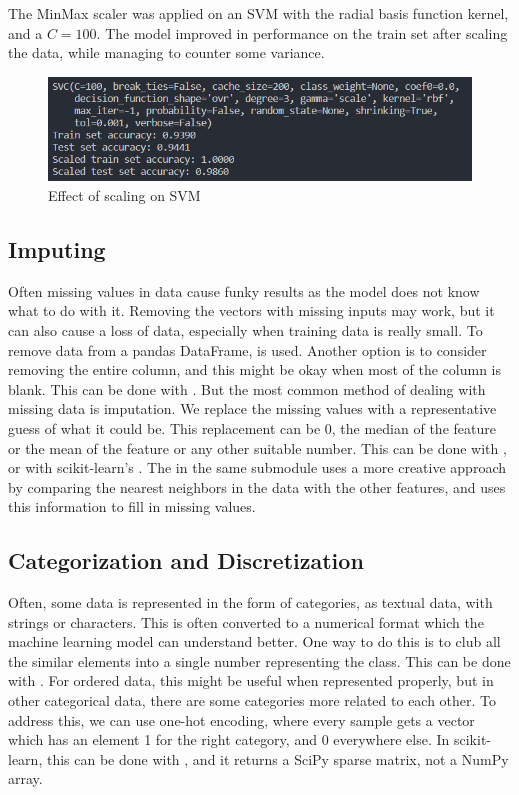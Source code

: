 \documentclass{article}
\newcommand{\code}[1]{{\fontfamily{zi4} \selectfont{#1}}}
\begin{document}
The MinMax scaler was applied on an SVM with the radial basis function kernel, and a $C=100$. The model improved in performance on the train set after scaling the data, while managing to counter some variance.

\begin{figure}[H]
\includegraphics[width=0.8\linewidth]{Images/svm_with_scaling.png}
\centering
\caption{Effect of scaling on SVM}
\end{figure}

\subsection{Imputing}
Often missing values in data cause funky results as the model does not know what to do with it. Removing the vectors with missing inputs may work, but it can also cause a loss of data, especially when training data is really small. To remove data from a pandas DataFrame, \code{DataFrame.dropna()} is used. Another option is to consider removing the entire column, and this might be okay when most of the column is blank. This can be done with \code{DataFrame.drop()}. But the most common method of dealing with missing data is imputation. We replace the missing values with a representative guess of what it could be. This replacement can be 0, the median of the feature or the mean of the feature or any other suitable number. This can be done with \code{DataFrame.fillna()}, or with scikit-learn's \code{sklearn.impute.SimpleImputer}. The \code{KNNImputer} in the same submodule uses a more creative approach by comparing the nearest neighbors in the data with the other features, and uses this information to fill in missing values.

\subsection{Categorization and Discretization}
Often, some data is represented in the form of categories, as textual data, with strings or characters. This is often converted to a numerical format which the machine learning model can understand better. One way to do this is to club all the similar elements into a single number representing the class. This can be done with \code{sklearn.preprocessing.OrdinalEncoder}. For ordered data, this might be useful when represented properly, but in other categorical data, there are some categories more related to each other. To address this, we can use one-hot encoding, where every sample gets a vector which has an element 1 for the right category, and 0 everywhere else. In scikit-learn, this can be done with \code{OneHotEncoder}, and it returns a SciPy sparse matrix, not a NumPy array.
\end{document}
